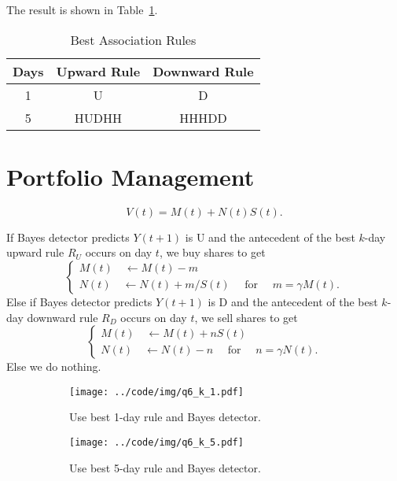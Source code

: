 \documentclass[runningheads]{llncs}
\begin{document}
The result is shown in Table~\ref{tab:5}.
\begin{table}[!htbp]
    \centering
    \caption{Best Association Rules}
    \label{tab:5}
    \begin{tabular}{|c|c|c|}
        \hline
        \textbf{Days} & \textbf{Upward Rule} & \textbf{Downward Rule} \\ \hline
        1             & U                    & D                      \\ \hline
        5             & HUDHH                & HHHDD                  \\ \hline
    \end{tabular}
\end{table}


\section{Portfolio Management}\label{sec:6}

\begin{equation}
    V(t)=M(t)+N(t)S(t).
\end{equation}

If Bayes detector predicts $Y(t+1)$ is U and the antecedent of the best $k$-day upward rule $R_U$ occurs on day $t$, we buy shares to get
\begin{equation}\label{eq:61}
    \left\{\begin{array}{l}
        M(t) \quad \leftarrow M(t)-m \\
        N(t) \quad \leftarrow N(t)+m / S(t) \quad \text { for } \quad m=\gamma M(t) .
    \end{array}\right.
\end{equation}
Else if Bayes detector predicts $Y(t+1)$ is D and the antecedent of the best $k$-day downward rule $R_D$ occurs on day $t$, we sell shares to get
\begin{equation}\label{eq:62}
    \left\{\begin{array}{l}
        M(t) \quad \leftarrow M(t)+n S(t) \\
        N(t) \quad \leftarrow N(t)-n  \quad \text { for } \quad n=\gamma N(t) .
    \end{array}\right.
\end{equation}
Else we do nothing.



\begin{figure}[!htbp]
    \begin{subfigure}[t]{0.49\textwidth}
        \centering
        \texttt{[image: ../code/img/q6\_k\_1.pdf]}
        \caption{Use best 1-day rule and Bayes detector.}
    \end{subfigure}
    \begin{subfigure}[t]{0.49\textwidth}
        \centering
        \texttt{[image: ../code/img/q6\_k\_5.pdf]}
        \caption{Use best 5-day rule and Bayes detector.}
    \end{subfigure}
    \caption{}
    \label{fig:q6}
\end{figure}
\end{document}
